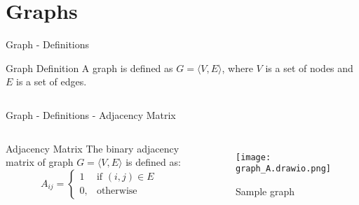 
\section{Graphs}

\begin{frame}{Graph - Definitions}
  \pause
  \begin{block}{Graph Definition}
    A graph is defined as $G = \langle V,E \rangle$, where $V$ is a set of 
    nodes and $E$ is a set of edges. 
  \end{block}


  \begin{columns}

    
    
  \end{columns}
\end{frame}

\begin{frame}{Graph - Definitions - Adjacency Matrix}
  \pause
  \begin{columns}

  \begin{block}{Adjacency Matrix}
    The binary adjacency matrix of graph $G = \langle V, E \rangle$ is defined as:
  \begin{equation}
      \label{eg:AdjacencyMatrix}
      A_{ij} =    
      \begin{cases}
          1  & \text{if } (i, j) \in E \\
          0, & \text{otherwise}
      \end{cases}
  \end{equation}
  \end{block}
  
  \begin{figure}
    \centering
    \texttt{[image: graph\_A.drawio.png]}
    \caption{Sample graph}        
  \end{figure}

\end{columns}

\end{frame}

